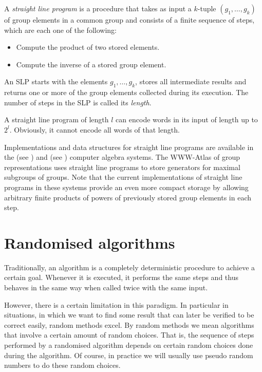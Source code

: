 \begin{Def}
    \label{defslp}
    A \emph{straight line program} is a procedure that takes as input a
    $k$-tuple $(g_1, \ldots, g_k)$ of group elements in a 
    common group and consists of a finite 
    sequence of steps, which are each one of the following:
\begin{itemize}
    \item Compute the product of two stored elements.
    \item Compute the inverse of a stored group element.
\end{itemize}
    An SLP starts with the elements $g_1, \ldots, g_k$,
    stores all intermediate results and returns one or more of the 
    group elements collected during its execution. The number of
    steps in the SLP is called its \emph{length}.
\end{Def}

\begin{Rem}
A straight line program of length $l$ can encode words in its input
of length up to $2^l$. Obviously, it cannot encode all words of that
length.
\end{Rem}

Implementations and data structures for straight line programs are
available in the {\GAP} (see \cite{GAP4}) and {\MAGMA} (see \cite{Magma})
computer algebra systems. The
WWW-Atlas of group representations uses straight line programs to
store generators for maximal subgroups of groups. Note that the
current implementations of straight line programs in these systems
provide an even more compact storage by allowing arbitrary finite
products of powers of previously stored group elements in each step.


\section{Randomised algorithms}
\label{montevegas}

Traditionally, an algorithm is a completely deterministic procedure to
achieve a certain goal. Whenever it is executed, it performs the same
steps and thus behaves in the same way when called twice with the same input.

However, there is a certain limitation in this paradigm. In particular
in situations, in which we want to find some result that can later
be verified to be correct easily, random methods excel. By random
methods we mean algorithms that involve a certain amount of random
choices. That is, the sequence of steps performed by a randomised
algorithm depends on certain random choices done during the algorithm.
Of course, in practice we will usually use pseudo random numbers to
do these random choices.

